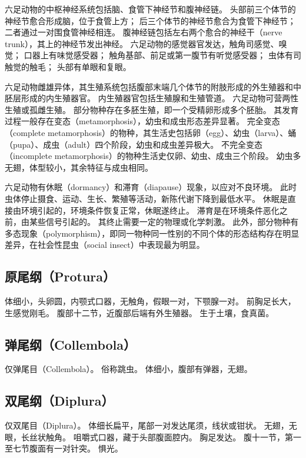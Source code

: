 \documentclass[11pt]{article}
\begin{document}
六足动物的中枢神经系统包括脑、食管下神经节和腹神经链。
头部前三个体节的神经节愈合形成脑，位于食管上方；
后三个体节的神经节愈合为食管下神经节；
二者通过一对围食管神经相连。
腹神经链包括左右两个愈合的神经干（nerve trunk），其上的神经节发出神经。
六足动物的感觉器官发达，触角司感觉、嗅觉；
口器上有味觉感受器；
触角基部、前足或第一腹节有听觉感受器；
虫体有司触觉的触毛；
头部有单眼和复眼。

\newline

六足动物雌雄异体，其生殖系统包括腹部末端几个体节的附肢形成的外生殖器和中胚层形成的内生殖器官。
内生殖器官包括生殖腺和生殖管道。
六足动物可营两性生殖或孤雌生殖。
部分物种存在多胚生殖，即一个受精卵形成多个胚胎。
其发育过程一般存在变态（metamorphosis），幼虫和成虫形态差异显著。
完全变态（complete metamorphosis）的物种，其生活史包括卵（egg）、幼虫（larva）、蛹（pupa）、成虫（adult）四个阶段，幼虫和成虫差异极大。
不完全变态（incomplete metamorphosis）的物种生活史仅卵、幼虫、成虫三个阶段。
幼虫多无翅，体型较小，其余特征与成虫相同。

\newline

六足动物有休眠（dormancy）和滞育（diapause）现象，以应对不良环境。
此时虫体停止摄食、运动、生长、繁殖等活动，新陈代谢下降到最低水平。
休眠是直接由环境引起的，环境条件恢复正常，休眠遂终止。
滞育是在环境条件恶化之前，由某些信号引起的。
其终止需要一定的物理或化学刺激。
此外，部分物种有多态现象（polymorphism），即同一物种同一性别的不同个体的形态结构存在明显差异，在社会性昆虫（social insect）中表现最为明显。

\subsection{原尾纲（Protura）}
体细小，头卵圆，内颚式口器，无触角，假眼一对，下颚腺一对。
前胸足长大，生感觉刚毛。
腹部十二节，近腹部后端有外生殖器。
生于土壤，食真菌。

\subsection{弹尾纲（Collembola）}
仅弹尾目（Collembola）。
俗称跳虫。
体细小，腹部有弹器，无翅。

\subsection{双尾纲（Diplura）}
仅双尾目（Diplura）。
体细长扁平，尾部一对发达尾须，线状或钳状。
无翅，无眼，长丝状触角。
咀嚼式口器，藏于头部腹面腔内。
胸足发达。
腹十一节，第一至七节腹面有一对针突。
惧光。
\end{document}
